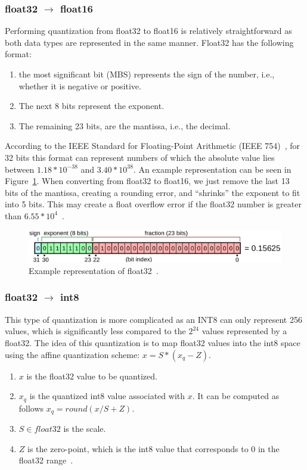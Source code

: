\documentclass[licencjacka,en]{pracamgr}
\begin{document}
\subsubsection{float32 $\rightarrow$ float16}
Performing quantization from float32 to float16 is relatively straightforward as both data types are represented in the same manner. Float32 has the following format:
\begin{enumerate}
	\item the most significant bit (MBS) represents the sign of the number, i.e., whether it is negative or positive.
	\item The next 8 bits represent the exponent.
	\item The remaining 23 bits, are the mantissa, i.e., the decimal.
\end{enumerate}

According to the IEEE Standard for Floating-Point Arithmetic (IEEE 754)~\cite{IEEE754}, for 32 bits this format can represent numbers of which the absolute value lies between $1.18 * 10^{-38}$ and $3.40 * 10^{38}$. An example representation can be seen in Figure~\ref{fig:float}.
When converting from float32 to float16, we just remove the last 13 bits of the mantissa, creating a rounding error, and “shrinks” the exponent to fit into 5 bits. This may create a float overflow error if the float32 number is greater than $ 6.55 * 10^4$~\cite{quant_explained}.

\begin{figure}
    \centering
    \includegraphics[width=1.0\linewidth]{bachelor_images/mantis.png}
    \caption{Example representation of float32~\cite{IEEE754}.}
    \label{fig:float}
\end{figure}

\subsubsection{float32 $\rightarrow$ int8}
This type of quantization is more complicated as an INT8 can only represent 256 values, which is significantly less compared to the $ 2^{24} $  values represented by a float32. The idea of this quantization is to map float32 values into the int8 space using the affine quantization scheme: $ x = S * (x_q - Z) $.
\begin{enumerate}
	\item $ x $ is the float32 value to be quantized.
	\item  $ x_q $ is the quantized int8 value associated with $ x $. It can be computed as follows $ x_q = round(x/S + Z) $.
	\item $ S \in float32$ is the scale.
	\item $ Z $ is the zero-point, which is the int8 value that corresponds to 0 in the float32 range~\cite{quant_hf}.
\end{enumerate}
\end{document}
